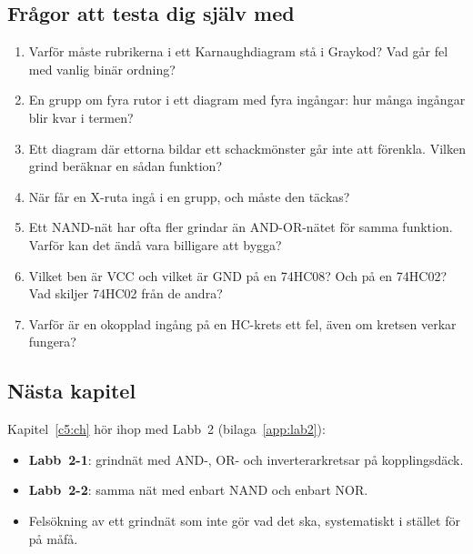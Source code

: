 \subsection*{Frågor att testa dig själv med}
\begin{enumerate}
  \item Varför måste rubrikerna i ett Karnaughdiagram stå i Graykod? Vad går fel med vanlig binär
    ordning?
  \item En grupp om fyra rutor i ett diagram med fyra ingångar: hur många ingångar blir kvar i
    termen?
  \item Ett diagram där ettorna bildar ett schackmönster går inte att förenkla. Vilken grind
    beräknar en sådan funktion?
  \item När får en X-ruta ingå i en grupp, och måste den täckas?
  \item Ett NAND-nät har ofta fler grindar än AND-OR-nätet för samma funktion. Varför kan det ändå
    vara billigare att bygga?
  \item Vilket ben är VCC och vilket är GND på en 74HC08? Och på en 74HC02? Vad skiljer 74HC02 från
    de andra?
  \item Varför är en okopplad ingång på en HC-krets ett fel, även om kretsen verkar fungera?
\end{enumerate}

\subsection*{Nästa kapitel}
Kapitel~\ref{c5:ch} hör ihop med Labb~2 (bilaga~\ref{app:lab2}):
\begin{itemize}
  \item \textbf{Labb~2-1}: grindnät med AND-, OR- och inverterarkretsar på kopplingsdäck.
  \item \textbf{Labb~2-2}: samma nät med enbart NAND och enbart NOR.
  \item Felsökning av ett grindnät som inte gör vad det ska, systematiskt i stället för på måfå.
\end{itemize}
